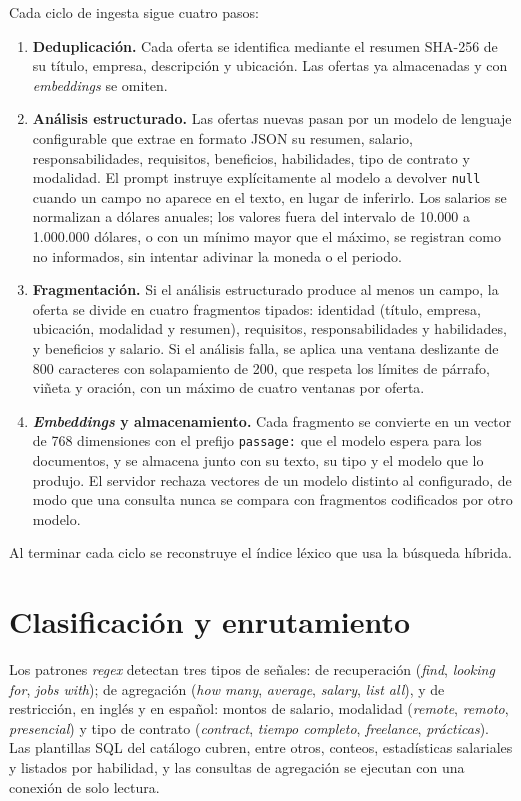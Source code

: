Cada ciclo de ingesta sigue cuatro pasos:
\begin{enumerate}
    \item \textbf{Deduplicación.} Cada oferta se identifica mediante el resumen SHA-256 de su título, empresa, descripción y ubicación. Las ofertas ya almacenadas y con \textit{embeddings} se omiten.
    \item \textbf{Análisis estructurado.} Las ofertas nuevas pasan por un modelo de lenguaje configurable que extrae en formato JSON su resumen, salario, responsabilidades, requisitos, beneficios, habilidades, tipo de contrato y modalidad. El prompt instruye explícitamente al modelo a devolver \texttt{null} cuando un campo no aparece en el texto, en lugar de inferirlo. Los salarios se normalizan a dólares anuales; los valores fuera del intervalo de 10.000 a 1.000.000 dólares, o con un mínimo mayor que el máximo, se registran como no informados, sin intentar adivinar la moneda o el periodo.
    \item \textbf{Fragmentación.} Si el análisis estructurado produce al menos un campo, la oferta se divide en cuatro fragmentos tipados: identidad (título, empresa, ubicación, modalidad y resumen), requisitos, responsabilidades y habilidades, y beneficios y salario. Si el análisis falla, se aplica una ventana deslizante de 800 caracteres con solapamiento de 200, que respeta los límites de párrafo, viñeta y oración, con un máximo de cuatro ventanas por oferta.
    \item \textbf{\textit{Embeddings} y almacenamiento.} Cada fragmento se convierte en un vector de 768 dimensiones con el prefijo \texttt{passage:} que el modelo espera para los documentos, y se almacena junto con su texto, su tipo y el modelo que lo produjo. El servidor rechaza vectores de un modelo distinto al configurado, de modo que una consulta nunca se compara con fragmentos codificados por otro modelo.
\end{enumerate}
Al terminar cada ciclo se reconstruye el índice léxico que usa la búsqueda híbrida.

\section{Clasificación y enrutamiento}
\label{anx:clasificacion}

Los patrones \textit{regex} detectan tres tipos de señales: de recuperación (\textit{find}, \textit{looking for}, \textit{jobs with}); de agregación (\textit{how many}, \textit{average}, \textit{salary}, \textit{list all}), y de restricción, en inglés y en español: montos de salario, modalidad (\textit{remote}, \textit{remoto}, \textit{presencial}) y tipo de contrato (\textit{contract}, \textit{tiempo completo}, \textit{freelance}, \textit{prácticas}). Las plantillas SQL del catálogo cubren, entre otros, conteos, estadísticas salariales y listados por habilidad, y las consultas de agregación se ejecutan con una conexión de solo lectura.

